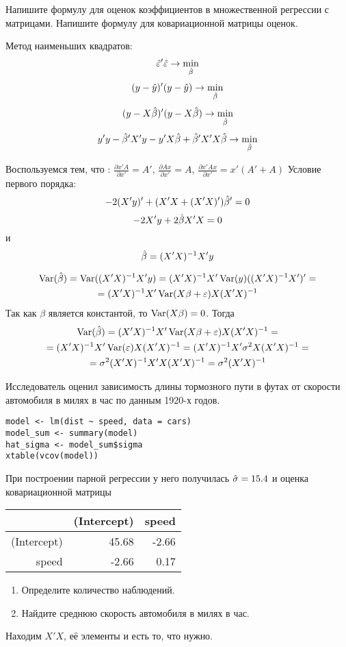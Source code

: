 \begin{problem}
Напишите формулу для оценок коэффициентов в множественной регрессии с матрицами. Напишите формулу для ковариационной матрицы оценок.


\begin{sol}

Метод наименьших квадратов:
\[\hat{\varepsilon}'\hat{\varepsilon}\rightarrow \min_{\hat{\beta}}\]
\[(y-\hat{y})'(y-\hat{y})\rightarrow\min_{\hat{\beta}}\]
\[(y-X\hat{\beta})'(y-X\hat{\beta})\rightarrow\min_{\hat{\beta}}\]
\[y'y-\hat{\beta}' X'y-y'X\hat{\beta}+\hat{\beta}'X'X\hat{\beta}\rightarrow\min_{\hat{\beta}}\]

Воспользуемся тем, что : $\frac{\partial x'A}{\partial x'}=A'$, $\frac{\partial Ax}{\partial x'}=A$,
$\frac{\partial x'Ax}{\partial x'}=x'(A'+A)$
Условие первого порядка:
\[-2(X'y)'+(X'X+(X'X)')\hat{\beta}'=0\]
\[-2X'y+2\hat{\beta} X'X=0\]
и
\[\hat{\beta}=(X'X)^{-1}X'y\]

\begin{multline*}
\operatorname{Var}(\hat\beta)=\operatorname{Var}((X'X)^{-1}X'y)=(X'X)^{-1}X'\operatorname{Var}(y)((X'X)^{-1}X')'=\\
=(X'X)^{-1}X'\operatorname{Var}(X\beta+\varepsilon)X(X'X)^{-1}
\end{multline*}
Так как $\beta$ является константой, то $\operatorname{Var}(X\beta)=0$. Тогда
\begin{multline*}
\operatorname{Var}(\hat\beta)=(X'X)^{-1}X'\operatorname{Var}(X\beta+\varepsilon)X(X'X)^{-1}=\\=(X'X)^{-1}X'\operatorname{Var}(\varepsilon)X(X'X)^{-1}=
(X'X)^{-1}X'\sigma^2X(X'X)^{-1}=\\=\sigma^2(X'X)^{-1}X'X(X'X)^{-1}=\sigma^2(X'X)^{-1}
\end{multline*}
\end{sol}
\end{problem}


\begin{problem}
Исследователь оценил зависимость длины тормозного пути в футах от скорости автомобиля в милях в час по данным 1920-х годов.

\begin{verbatim}
model <- lm(dist ~ speed, data = cars)
model_sum <- summary(model)
hat_sigma <- model_sum$sigma
xtable(vcov(model))
\end{verbatim}


При построении парной регрессии у него получилась $\hat{\sigma}=15.4$ и оценка ковариационной матрицы

\begin{tabular}{rrr}
  \hline
 & (Intercept) & speed \\
  \hline
(Intercept) & 45.68 & -2.66 \\
  speed & -2.66 & 0.17 \\
   \hline
\end{tabular}


\begin{enumerate}
\item Определите количество наблюдений.
\item Найдите среднюю скорость автомобиля в милях в час.
\end{enumerate}


\begin{sol}
Находим $X'X$, её элементы и есть то, что нужно.
\end{sol}
\end{problem}





